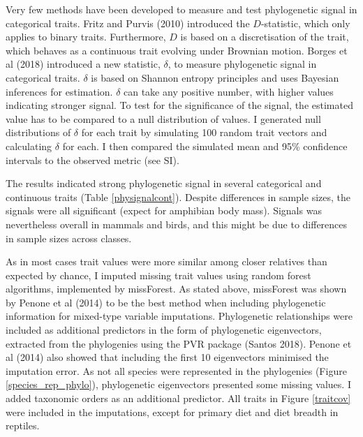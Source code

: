 Very few methods have been developed to measure and test phylogenetic signal in categorical traits. Fritz and Purvis (2010) introduced the $D$-statistic, which only applies to binary traits. Furthermore, $D$ is based on a discretisation of the trait, which behaves as a continuous trait evolving under Brownian motion. Borges et al (2018) introduced a new statistic, $\delta$, to measure phylogenetic signal in categorical traits. $\delta$ is based on Shannon entropy principles and uses Bayesian inferences for estimation. $\delta$ can take any positive number, with higher values indicating stronger signal. To test for the significance of the signal, the estimated value has to be compared to a null distribution of values. I generated null distributions of $\delta$  for each trait by simulating 100 random trait vectors and calculating $\delta$ for each. I then compared the simulated mean and 95\% confidence intervals to the observed metric (see SI).

The results indicated strong phylogenetic signal in several categorical and continuous traits (Table \ref{physignalcont}). Despite differences in sample sizes, the signals were all significant (expect for amphibian body mass). Signals was nevertheless overall in mammals and birds, and this might be due to differences in sample sizes across classes. 

As in most cases trait values were more similar among closer relatives than expected by chance, I imputed missing trait values using random forest algorithms, implemented by missForest. As stated above, missForest was shown by Penone et al (2014) to be the best method when including phylogenetic information for mixed-type variable imputations. Phylogenetic relationships were included as additional predictors in the form of phylogenetic eigenvectors, extracted from the phylogenies using the PVR package (Santos 2018). Penone et al (2014) also showed that including the first 10 eigenvectors minimised the imputation error. As not all species were represented in the phylogenies (Figure \ref{species_rep_phylo}), phylogenetic eigenvectors presented some missing values. I added taxonomic orders as an additional predictor. All traits in Figure \ref{traitcov} were included in the imputations, except for primary diet and diet breadth in reptiles.


